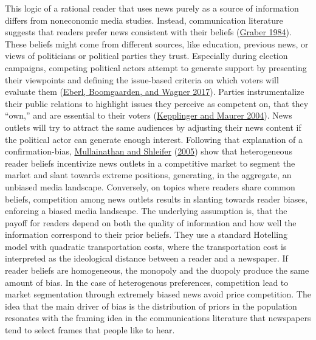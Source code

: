 \documentclass[
  12pt,
]{article}
\begin{document}
This logic of a rational reader that uses news purely as a source of
information differs from noneconomic media studies. Instead,
communication literature suggests that readers prefer news consistent
with their beliefs
(\protect\hyperlink{ref-graber_processing_1984}{Graber 1984}). These
beliefs might come from different sources, like education, previous
news, or views of politicians or political parties they trust.
Especially during election campaigns, competing political actors attempt
to generate support by presenting their viewpoints and defining the
issue-based criteria on which voters will evaluate them
(\protect\hyperlink{ref-eberl_one_2017}{Eberl, Boomgaarden, and Wagner
2017}). Parties instrumentalize their public relations to highlight
issues they perceive as competent on, that they ``own,'' and are
essential to their voters
(\protect\hyperlink{ref-kepplinger_einfluss_2004}{Kepplinger and Maurer
2004}). News outlets will try to attract the same audiences by adjusting
their news content if the political actor can generate enough interest.
Following that explanation of a confirmation-bias,
\protect\hyperlink{ref-mullainathan_market_2005}{Mullainathan and
Shleifer} (\protect\hyperlink{ref-mullainathan_market_2005}{2005}) show
that heterogeneous reader beliefs incentivize news outlets in a
competitive market to segment the market and slant towards extreme
positions, generating, in the aggregate, an unbiased media landscape.
Conversely, on topics where readers share common beliefs, competition
among news outlets results in slanting towards reader biases, enforcing
a biased media landscape. The underlying assumption is, that the payoff
for readers depend on both the quality of information and how well the
information correspond to their prior beliefs. They use a standard
Hotelling model with quadratic transportation costs, where the
transportation cost is interpreted as the ideological distance between a
reader and a newspaper. If reader beliefs are homogeneous, the monopoly
and the duopoly produce the same amount of bias. In the case of
heterogenous preferences, competition lead to market segmentation
through extremely biased news avoid price competition. The idea that the
main driver of bias is the distribution of priors in the population
resonates with the framing idea in the communications literature that
newspapers tend to select frames that people like to hear.
\end{document}
